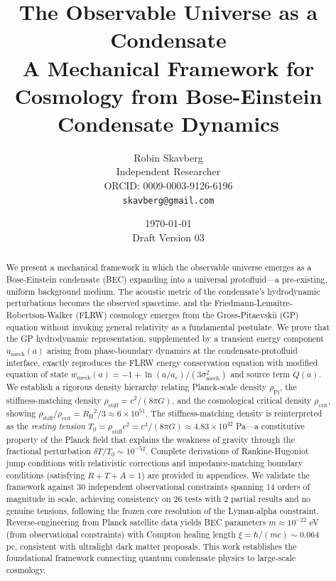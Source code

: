 \documentclass[11pt,a4paper]{article}
\title{\textbf{The Observable Universe as a Condensate}\\[0.5em]
\large A Mechanical Framework for Cosmology from Bose-Einstein Condensate Dynamics}
\author{Robin Skavberg\\[0.3em]
\small Independent Researcher\\
\small ORCID: 0009-0003-9126-6196\\
\small \texttt{skavberg@gmail.com}}
\date{\today\\[0.5em]
\small Draft Version 03}
\newcommand{\rhocrit}{\ensuremath{\rho_{\mathrm{crit}}}}
\newcommand{\rhostiff}{\ensuremath{\rho_{\mathrm{stiff}}}}
\newcommand{\rhoPl}{\ensuremath{\rho_{\mathrm{Pl}}}}
\newcommand{\Tzero}{\ensuremath{T_0}}
\newcommand{\RH}{\ensuremath{R_{\mathrm{H}}}}
\newcommand{\umech}{\ensuremath{u_{\mathrm{mech}}}}
\newcommand{\wmech}{\ensuremath{w_{\mathrm{mech}}}}
\theoremstyle{definition}
\theoremstyle{remark}
\begin{document}
\maketitle

\begin{abstract}
We present a mechanical framework in which the observable universe emerges as a Bose-Einstein condensate (BEC) expanding into a universal protofluid---a pre-existing, uniform background medium. The acoustic metric of the condensate's hydrodynamic perturbations becomes the observed spacetime, and the Friedmann-Lema\^itre-Robertson-Walker (FLRW) cosmology emerges from the Gross-Pitaevskii (GP) equation without invoking general relativity as a fundamental postulate. We prove that the GP hydrodynamic representation, supplemented by a transient energy component $\umech(a)$ arising from phase-boundary dynamics at the condensate-protofluid interface, exactly reproduces the FLRW energy conservation equation with modified equation of state $\wmech(a) = -1 + \ln(a/a_c)/(3\sigma_{\mathrm{mech}}^2)$ and source term $Q(a)$. We establish a rigorous density hierarchy relating Planck-scale density $\rhoPl$, the stiffness-matching density $\rhostiff = c^2/(8\pi G)$, and the cosmological critical density $\rhocrit$, showing $\rhostiff/\rhocrit = \RH^2/3 \approx 6 \times 10^{51}$. The stiffness-matching density is reinterpreted as the \emph{resting tension} $\Tzero = \rhostiff c^2 = c^4/(8\pi G) \approx 4.83 \times 10^{42}$ Pa---a constitutive property of the Planck field that explains the weakness of gravity through the fractional perturbation $\delta T/\Tzero \sim 10^{-52}$. Complete derivations of Rankine-Hugoniot jump conditions with relativistic corrections and impedance-matching boundary conditions (satisfying $R + T + A = 1$) are provided in appendices. We validate the framework against 30 independent observational constraints spanning 14 orders of magnitude in scale, achieving consistency on 26 tests with 2 partial results and no genuine tensions, following the frozen core resolution of the Lyman-alpha constraint. Reverse-engineering from Planck satellite data yields BEC parameters $m \approx 10^{-22}$ eV (from observational constraints) with Compton healing length $\xi = \hbar/(mc) \sim 0.064$ pc, consistent with ultralight dark matter proposals. This work establishes the foundational framework connecting quantum condensate physics to large-scale cosmology.
\end{abstract}

\tableofcontents
\newpage
\end{document}
